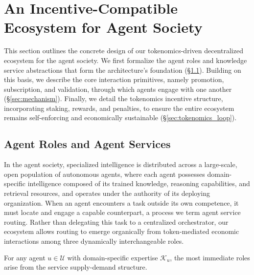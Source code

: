 \section{An Incentive-Compatible Ecosystem for Agent Society}
\label{sec:ecosystem}

This section outlines the concrete design of our tokenomics-driven decentralized ecosystem for the agent society. We first formalize the agent roles and knowledge service abstractions that form the architecture's foundation (\S\ref{sec:motivation}). Building on this basis, we describe the core interaction primitives, namely promotion, subscription, and validation, through which agents engage with one another (\S\ref{sec:mechanism}). Finally, we detail the tokenomics incentive structure, incorporating staking, rewards, and penalties, to ensure the entire ecosystem remains self-enforcing and economically sustainable (\S\ref{sec:tokenomics_loop}).


\subsection{Agent Roles and Agent Services}
\label{sec:motivation}

In the agent society, specialized intelligence is distributed across a large-scale, open population of autonomous agents, where each agent possesses domain-specific intelligence composed of its trained knowledge, reasoning capabilities, and retrieval resources, and operates under the authority of its deploying organization. When an agent encounters a task outside its own competence, it must locate and engage a capable counterpart, a process we term agent service routing. Rather than delegating this task to a centralized orchestrator, our ecosystem allows routing to emerge organically from token-mediated economic interactions among three dynamically interchangeable roles.

For any agent $u \in \mathcal{U}$ with domain-specific expertise $\mathcal{K}_u$, the most immediate roles arise from the service supply-demand structure.


